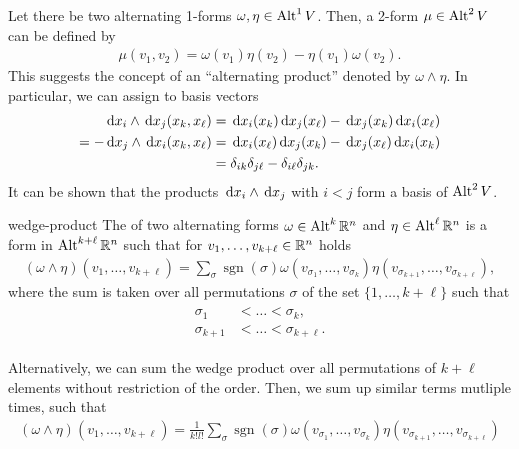 \begin{example}
  Let there be two alternating 1-forms $\omega, \eta \in \operatorname{Alt}^1V$.
  Then, a 2-form $\mu \in \operatorname{Alt}^2V$ can be defined by
  \begin{gather}
    \mu(v_1, v_2) = \omega(v_1)\eta(v_2) - \eta(v_1)\omega(v_2).
  \end{gather}
  This suggests the concept of an ``alternating product'' denoted by $\omega \wedge \eta$. In
  particular, we can assign to basis vectors
  \begin{align}
    \,\mathrm{d} x_i \wedge \,\mathrm{d} x_j (x_k,x_\ell)
    &= \,\mathrm{d} x_i(x_k)\,\mathrm{d} x_j(x_\ell) - \,\mathrm{d} x_j(x_k)\,\mathrm{d} x_i(x_\ell) \\
    = - \,\mathrm{d} x_j \wedge \,\mathrm{d} x_i(x_k,x_\ell) &= \,\mathrm{d} x_i(x_\ell)\,\mathrm{d} x_j(x_k) - \,\mathrm{d} x_j(x_\ell)\,\mathrm{d} x_i(x_k) \\
    &= \delta_{ik}\delta_{j\ell} - \delta_{i\ell}\delta_{jk}.
  \end{align}
  It can be shown that the products $\,\mathrm{d} x_i\wedge \,\mathrm{d} x_j$ with $i<j$ form a basis of $\operatorname{Alt}^2V$.
\end{example}

\begin{Definition}{wedge-product}
  The  of two alternating forms
  $\omega\in \operatorname{Alt}^k\mathbb R^n$ and $\eta\in\operatorname{Alt}^\ell\mathbb R^n$ is a form in $\operatorname{Alt}^{k+\ell}\mathbb R^n$ such that for
  $v_1,\dots,v_{k+\ell}\in\mathbb R^n$ holds
  \begin{gather}
    (\omega\wedge\eta)(v_1,\dots,v_{k+\ell})
    = \sum_{\sigma} \operatorname{sgn}(\sigma) \omega(v_{\sigma_1},\dots,v_{\sigma_k})
    \eta(v_{\sigma_{k+1}},\dots,v_{\sigma_{k+\ell}}),
  \end{gather}
  where the sum is taken over all permutations $\sigma$ of the set
  $\{1,\dots,k+\ell\}$ such that
  \begin{gather}
    \begin{split}
      \sigma_1 &< \dots < \sigma_k,\\
      \sigma_{k+1} & < \dots < \sigma_{k+\ell}.
    \end{split}
  \end{gather}
\end{Definition}

\begin{remark}
  Alternatively, we can sum the wedge product over all permutations of
  $k+\ell$ elements without restriction of the order. Then, we sum up
  similar terms mutliple times, such that
  \begin{gather}
    (\omega\wedge\eta)(v_1,\dots,v_{k+\ell})
    = \frac1{k!l!}\sum_{\sigma} \operatorname{sgn}(\sigma) \omega(v_{\sigma_1},\dots,v_{\sigma_k})
    \eta(v_{\sigma_{k+1}},\dots,v_{\sigma_{k+\ell}})
  \end{gather}
\end{remark}

